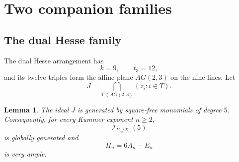 \documentclass[11pt]{article}
\newtheorem{lemma}[theorem]{Lemma}
\newcommand{\cI}{\mathcal I}
\begin{document}
\section{Two companion families}\label{sec:companions}

\subsection{The dual Hesse family}

The dual Hesse arrangement has
\[
        k=9,\qquad t_3=12,
\]
and its twelve triples form the affine plane $AG(2,3)$ on the nine lines.
Let
\[
        J=\bigcap_{T\in AG(2,3)}(z_i:i\in T).
\]

\begin{lemma}\label{lem:dual-hesse-degree5}
The ideal $J$ is generated by square-free monomials of degree $5$.  Consequently,
for every Kummer exponent $n\ge2$,
\[
        \cI_{\Sigma_n/X_n}(5)
\]
is globally generated and
\[
        H_n=6A_n-E_n
\]
is very ample.
\end{lemma}
\end{document}
